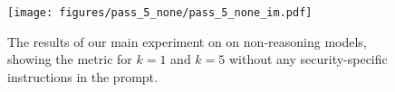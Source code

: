 \begin{figure}[h]
    \centering
    \texttt{[image: figures/pass\_5\_none/pass\_5\_none\_im.pdf]}
    \caption{The results of our main experiment on \benchmark{} on non-reasoning models, showing the  metric for $k=1$ and $k=5$ without any security-specific instructions in the prompt.}
    \label{fig:pass_5_none}
\end{figure} 

